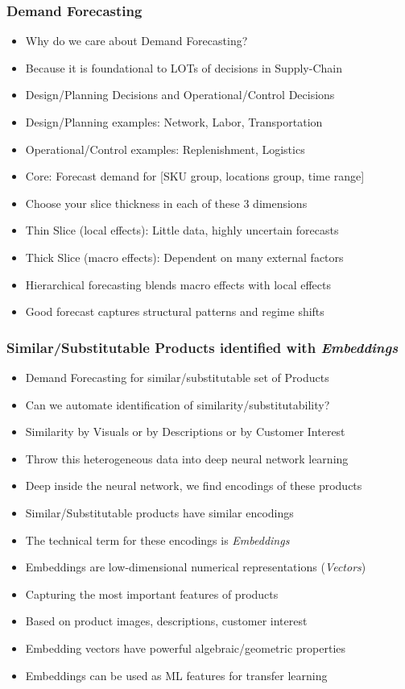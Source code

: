 \documentclass[handout]{beamer}
\begin{document}
\begin{frame}
\frametitle{Demand Forecasting}
\pause
\begin{itemize}[<+->]
\item Why do we care about Demand Forecasting?
\item Because it is foundational to LOTs of decisions in Supply-Chain
\item Design/Planning Decisions and Operational/Control Decisions
\item Design/Planning examples: Network, Labor, Transportation
\item Operational/Control examples: Replenishment, Logistics
\item Core: Forecast demand for [SKU group, locations group, time range]
\item Choose your slice thickness in each of these 3 dimensions
\item Thin Slice (local effects): Little data, highly uncertain forecasts
\item Thick Slice (macro effects): Dependent on many external factors
\item Hierarchical forecasting blends macro effects with local effects
\item Good forecast captures structural patterns and regime shifts
\end{itemize}
\end{frame}

\begin{frame}
\frametitle{Similar/Substitutable Products identified with {\em Embeddings}}
\pause
\begin{itemize}[<+->]
\item Demand Forecasting for similar/substitutable set of Products
\item Can we automate identification of similarity/substitutability?
\item Similarity by Visuals or by Descriptions or by Customer Interest
\item Throw this heterogeneous data into deep neural network learning
\item Deep inside the neural network, we find encodings of these products
\item Similar/Substitutable products have similar encodings
\item The technical term for these encodings is {\em Embeddings}
\item Embeddings are low-dimensional numerical representations ({\em Vectors})
\item Capturing the most important features of products
\item Based on product images, descriptions, customer interest
\item Embedding vectors have powerful algebraic/geometric properties
\item Embeddings can be used as ML features for transfer learning
\end{itemize}
\end{frame}
\end{document}
